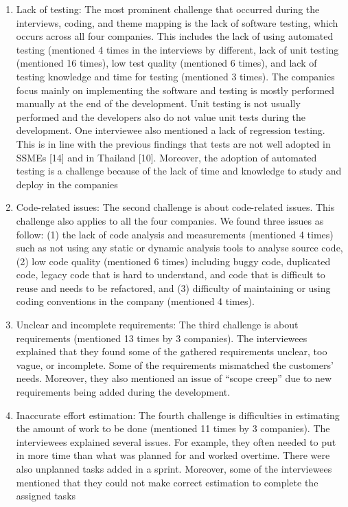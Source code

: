 \documentclass[conference]{IEEEtran}
\begin{document}
\begin{enumerate}
\item Lack of testing:
The most prominent challenge that
occurred during the interviews, coding, and theme mapping
is the lack of software testing, which occurs across all four
companies. This includes the lack of using automated testing
(mentioned 4 times in the interviews by different, lack of unit testing (mentioned 16 times), low test
quality (mentioned 6 times), and lack of testing knowledge
and time for testing (mentioned 3 times). The companies focus
mainly on implementing the software and testing is mostly
performed manually at the end of the development. Unit
testing is not usually performed and the developers also do
not value unit tests during the development. One interviewee
also mentioned a lack of regression testing. This is in line
with the previous findings that tests are not well adopted in
SSMEs [14] and in Thailand [10]. Moreover, the adoption of
automated testing is a challenge because of the lack of time
and knowledge to study and deploy in the companies

\item Code-related issues:
The second challenge is about
code-related issues. This challenge also applies to all the four
companies. We found three issues as follow: (1) the lack of
code analysis and measurements (mentioned 4 times) such as
not using any static or dynamic analysis tools to analyse source
code, (2) low code quality (mentioned 6 times) including
buggy code, duplicated code, legacy code that is hard to
understand, and code that is difficult to reuse and needs to be
refactored, and (3) difficulty of maintaining or using coding
conventions in the company (mentioned 4 times).

\item Unclear and incomplete requirements:
The third challenge is about requirements (mentioned 13 times by 3 companies). The interviewees explained that they found some of
the gathered requirements unclear, too vague, or incomplete.
Some of the requirements mismatched the customers’ needs.
Moreover, they also mentioned an issue of “scope creep” due
to new requirements being added during the development.

\item Inaccurate effort estimation: 
The fourth challenge is
difficulties in estimating the amount of work to be done (mentioned 11 times by 3 companies). The interviewees explained
several issues. For example, they often needed to put in more
time than what was planned for and worked overtime. There
were also unplanned tasks added in a sprint. Moreover, some
of the interviewees mentioned that they could not make correct
estimation to complete the assigned tasks
\end{enumerate}
\end{document}
